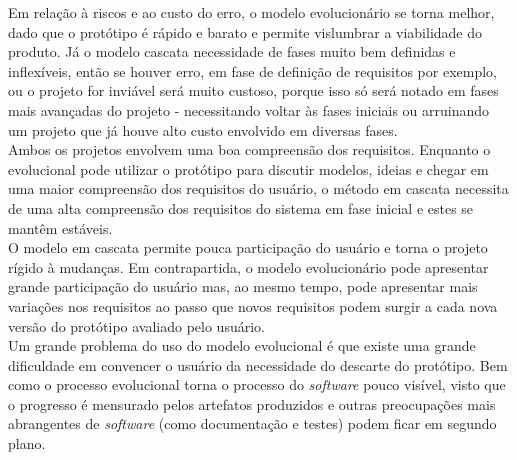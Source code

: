 \documentclass[12pt, a4paper]{article}
\newcommand{\tit}[1]{\textit{#1}}
\newcommand{\ssw}{\tit{software} }
\begin{document}
\begin{enumerate}[label=\textbf{\arabic*.}]
{        Em relação à riscos e ao custo do erro, o modelo evolucionário se torna melhor, dado que o protótipo é rápido e barato e permite vislumbrar a viabilidade do produto. Já o modelo cascata necessidade de fases muito bem definidas e inflexíveis, então se houver erro, em fase de definição de requisitos por exemplo, ou o projeto for inviável será muito custoso, porque isso só será notado em fases mais avançadas do projeto - necessitando voltar às fases iniciais ou arruinando um projeto que já houve alto custo envolvido em diversas fases.\\
        Ambos os projetos envolvem uma boa compreensão dos requisitos. Enquanto o evolucional pode utilizar o protótipo para discutir modelos, ideias e chegar em uma maior compreensão dos requisitos do usuário, o método em cascata necessita de uma alta compreensão dos requisitos do sistema em fase inicial e estes se mantêm estáveis. \\
        O modelo em cascata permite pouca participação do usuário e torna o projeto rígido à mudanças. Em contrapartida, o modelo evolucionário pode apresentar grande participação do usuário mas, ao mesmo tempo, pode apresentar mais variações nos requisitos ao passo que novos requisitos podem surgir a cada nova versão do protótipo avaliado pelo usuário. \\
        Um grande problema do uso do modelo evolucional é que existe uma grande dificuldade em convencer o usuário da necessidade do descarte do protótipo. Bem como o processo evolucional torna o processo do \ssw pouco visível, visto que o progresso é mensurado pelos artefatos produzidos e outras preocupações mais abrangentes de \ssw (como documentação e testes) podem ficar em segundo plano.
        } \\
        

\end{enumerate}
\end{document}
